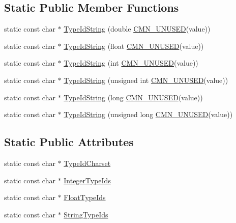 \subsection*{Static Public Member Functions}
\begin{DoxyCompactItemize}
\item 
static const char $\ast$ \hyperlink{classcmn_printf_parser_a4f993a50dd44170213634a69ddb6f506}{Type\-Id\-String} (double \hyperlink{cmn_portability_8h_a021894e2626935fa2305434b1e893ff6}{C\-M\-N\-\_\-\-U\-N\-U\-S\-E\-D}(value))
\item 
static const char $\ast$ \hyperlink{classcmn_printf_parser_a1ffb0e3946131318695e296f2fe9ae83}{Type\-Id\-String} (float \hyperlink{cmn_portability_8h_a021894e2626935fa2305434b1e893ff6}{C\-M\-N\-\_\-\-U\-N\-U\-S\-E\-D}(value))
\item 
static const char $\ast$ \hyperlink{classcmn_printf_parser_a918ecad4cd9d270e4c665708ac6d466e}{Type\-Id\-String} (int \hyperlink{cmn_portability_8h_a021894e2626935fa2305434b1e893ff6}{C\-M\-N\-\_\-\-U\-N\-U\-S\-E\-D}(value))
\item 
static const char $\ast$ \hyperlink{classcmn_printf_parser_a9e8bf01b132585801476d15b086998cf}{Type\-Id\-String} (unsigned int \hyperlink{cmn_portability_8h_a021894e2626935fa2305434b1e893ff6}{C\-M\-N\-\_\-\-U\-N\-U\-S\-E\-D}(value))
\item 
static const char $\ast$ \hyperlink{classcmn_printf_parser_a0dfe34db38bc6607765f799ce84a71a7}{Type\-Id\-String} (long \hyperlink{cmn_portability_8h_a021894e2626935fa2305434b1e893ff6}{C\-M\-N\-\_\-\-U\-N\-U\-S\-E\-D}(value))
\item 
static const char $\ast$ \hyperlink{classcmn_printf_parser_a195baec1618d776f4283fbdb43715862}{Type\-Id\-String} (unsigned long \hyperlink{cmn_portability_8h_a021894e2626935fa2305434b1e893ff6}{C\-M\-N\-\_\-\-U\-N\-U\-S\-E\-D}(value))
\end{DoxyCompactItemize}
\subsection*{Static Public Attributes}
\begin{DoxyCompactItemize}
\item 
static const char $\ast$ \hyperlink{classcmn_printf_parser_aaa4ca685e67cabb8319f6c6e5b754517}{Type\-Id\-Charset}
\item 
static const char $\ast$ \hyperlink{classcmn_printf_parser_aa256066fc793a612014ac148e6f5c938}{Integer\-Type\-Ids}
\item 
static const char $\ast$ \hyperlink{classcmn_printf_parser_ad7f764cf8f7fbb64a10f1a817b417015}{Float\-Type\-Ids}
\item 
static const char $\ast$ \hyperlink{classcmn_printf_parser_a44131161d46cb41973c04e59722332f1}{String\-Type\-Ids}
\end{DoxyCompactItemize}


